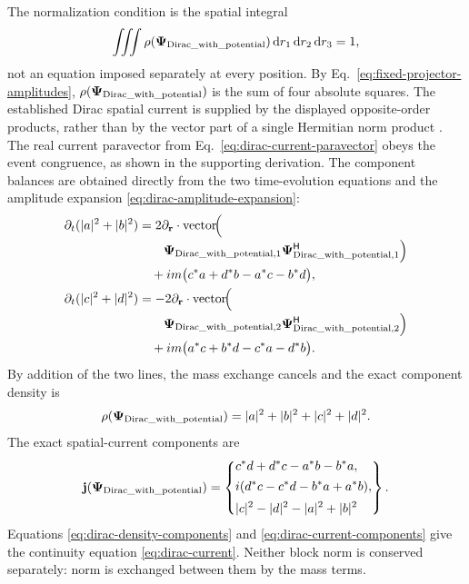 \documentclass[10pt,letterpaper]{article}
\let\STAamsmathtext\text
\newcommand{\eqtext}[1]{\STAamsmathtext{\normalfont\rmfamily #1}}
\newcommand{\eqfunc}[1]{\operatorname{#1}}
\renewcommand{\text}[1]{\STAamsmathtext{\normalfont\rmfamily #1}}
\newcommand{\pv}[1]{#1}
\newcommand{\vct}[1]{\mathbf{#1}}
\newcommand{\bPsi}{\pv{\bm{\Psi}}}
\newcommand{\delop}{\partial}
\newcommand{\delr}{\delop_{\vct{r}}}
\newcommand{\gradv}{\delr}
\newcommand{\Hop}{\mathsf H}
\newcommand{\herm}[1]{#1^{\Hop}}
\newcommand{\vthreeeq}[3]{%
  \left\{%
  \begin{aligned}
  & #1,\\[0.12em]
  & #2,\\[0.12em]
  & #3
  \end{aligned}%
  \right\}%
}
\newcommand{\dd}{\mathrm d}
\begin{document}
The normalization condition is the spatial integral
\[
\iiint\rho(\bPsi_{\eqtext{Dirac\_with\_potential}})\,
\dd r_1\,\dd r_2\,\dd r_3=1,
\]
not an equation imposed separately at every position. By
Eq.\ \eqref{eq:fixed-projector-amplitudes},
\(\rho(\bPsi_{\eqtext{Dirac\_with\_potential}})\) is the sum of four
absolute squares. The established Dirac spatial current is supplied by the
displayed opposite-order products, rather than by the vector part of a single
Hermitian norm product \cite{dirac1928,greiner2000}.
The real current paravector from Eq.\ \eqref{eq:dirac-current-paravector}
obeys the event congruence, as shown in the supporting derivation.
The component balances are obtained directly from the two time-evolution
equations and the amplitude expansion
\eqref{eq:dirac-amplitude-expansion}:
\begin{align}
\partial_t(|a|^2+|b|^2)
&=2\gradv\cdot\eqfunc{vector}\!\Bigl(\notag\\[-0.2em]
&\qquad
\bPsi_{\eqtext{Dirac\_with\_potential},1}
\herm{\bPsi_{\eqtext{Dirac\_with\_potential},1}}
\Bigr)\notag\\
&\quad+im\bigl(c^*a+d^*b-a^*c-b^*d\bigr),\notag\\
\partial_t(|c|^2+|d|^2)
&=-2\gradv\cdot\eqfunc{vector}\!\Bigl(\notag\\[-0.2em]
&\qquad
\bPsi_{\eqtext{Dirac\_with\_potential},2}
\herm{\bPsi_{\eqtext{Dirac\_with\_potential},2}}
\Bigr)\notag\\
&\quad+im\bigl(a^*c+b^*d-c^*a-d^*b\bigr).
\label{eq:dirac-continuity-components}
\end{align}
By addition of the two lines, the mass exchange cancels and the exact
component density is
\begin{equation}
\rho(\bPsi_{\eqtext{Dirac\_with\_potential}})
=|a|^2+|b|^2+|c|^2+|d|^2.
\label{eq:dirac-density-components}
\end{equation}
The exact spatial-current components are
\begin{equation}
\vct{j}(\bPsi_{\eqtext{Dirac\_with\_potential}})
=\vthreeeq
{c^*d+d^*c-a^*b-b^*a}
{i(d^*c-c^*d-b^*a+a^*b)}
{|c|^2-|d|^2-|a|^2+|b|^2}.
\label{eq:dirac-current-components}
\end{equation}
Equations \eqref{eq:dirac-density-components} and
\eqref{eq:dirac-current-components} give the continuity equation
\eqref{eq:dirac-current}. Neither
block norm is conserved separately: norm is exchanged between them by the
mass terms.
\end{document}
